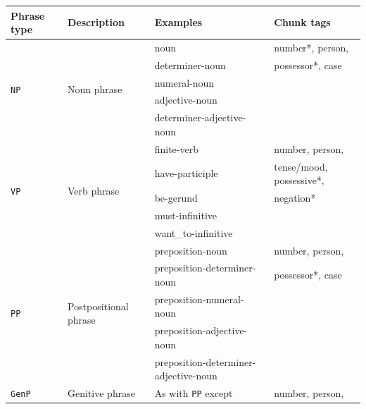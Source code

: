 \documentclass[11pt]{article}
\begin{document}
\begin{savenotes}
\begin{table}
  \centering
  \begin{tabular}{|l|l|l|l|}
    \hline
    \textbf{Phrase type} & \textbf{Description} & \textbf{Examples} & \textbf{Chunk tags} \\
    \hline
    \multirow{5}{*}{\texttt{NP}} & \multirow{5}{*}{Noun phrase}    & noun & number*, person, \\
                                 &                                 & determiner-noun & possessor*, case\\
                                 &                                 & numeral-noun & \\
                                 &                                 & adjective-noun & \\
                                 &                                 & determiner-adjective-noun & \\
    \hline
    \multirow{5}{*}{\texttt{VP}} & \multirow{5}{*}{Verb phrase}    & finite-verb & number, person, \\
                                 &                                 & have-participle & tense/mood, possessive*, \\
                                 &                                 & be-gerund & negation* \\
                                 &                                 & must-infinitive & \\ 
                                 &                                 & want\_to-infinitive & \\ 
    \hline
    \multirow{5}{*}{\texttt{PP}} & \multirow{5}{*}{Postpositional phrase} & preposition-noun & number, person, \\
                                 &                                        & preposition-determiner-noun & possessor*, case \\
                                 &                                        & preposition-numeral-noun & \\
                                 &                                        & preposition-adjective-noun & \\
                                 &                                        & preposition-determiner-adjective-noun & \\
    \hline
    \multirow{2}{*}{\texttt{GenP}} & \multirow{2}{*}{Genitive phrase}  & As with \texttt{PP} except & number, person, \\

\end{tabular}
\end{table}
\end{savenotes}
\end{document}
